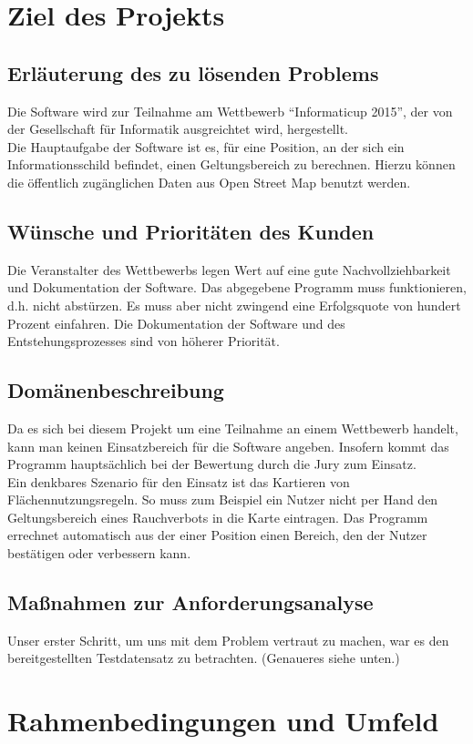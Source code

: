 \section{Ziel des Projekts}
\subsection{Erläuterung des zu lösenden Problems}
Die Software wird zur Teilnahme am Wettbewerb ``Informaticup 2015'', der von der Gesellschaft für Informatik ausgreichtet wird, hergestellt.\\
Die Hauptaufgabe der Software ist es, für eine Position, an der sich ein Informationsschild befindet, einen Geltungsbereich zu berechnen.
Hierzu können die öffentlich zugänglichen Daten aus Open Street Map benutzt werden.
\subsection{Wünsche und Prioritäten des Kunden}
Die Veranstalter des Wettbewerbs legen Wert auf eine gute Nachvollziehbarkeit und Dokumentation der Software.
Das abgegebene Programm muss funktionieren, d.h. nicht abstürzen. Es muss aber nicht zwingend eine Erfolgsquote von hundert Prozent einfahren.
Die Dokumentation der Software und des Entstehungsprozesses sind von höherer Priorität.
\subsection{Domänenbeschreibung}
Da es sich bei diesem Projekt um eine Teilnahme an einem Wettbewerb handelt, kann man keinen Einsatzbereich für die Software angeben.
Insofern kommt das Programm hauptsächlich bei der Bewertung durch die Jury zum Einsatz.\\
Ein denkbares Szenario für den Einsatz ist das Kartieren von Flächennutzungsregeln. So muss zum Beispiel ein Nutzer nicht per Hand
den Geltungsbereich eines Rauchverbots in die Karte eintragen. Das Programm errechnet automatisch aus der einer Position einen Bereich, den
der Nutzer bestätigen oder verbessern kann.
\subsection{Maßnahmen zur Anforderungsanalyse}
Unser erster Schritt, um uns mit dem Problem vertraut zu machen, war es den bereitgestellten Testdatensatz zu betrachten.
(Genaueres siehe unten.)
\section{Rahmenbedingungen und Umfeld}
